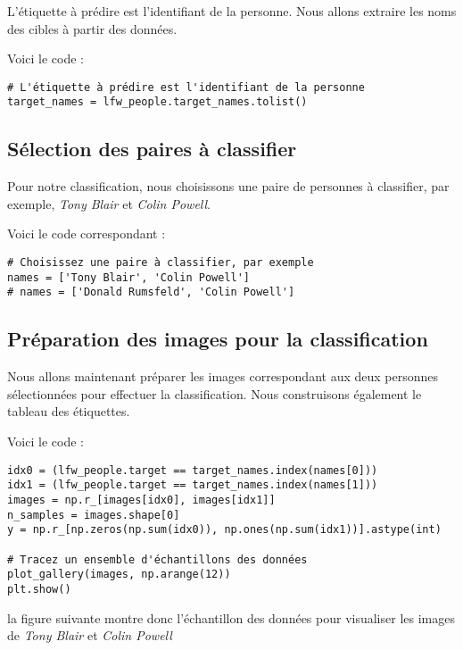 \documentclass{article}
\begin{document}
\begin{itemize}
L'étiquette à prédire est l'identifiant de la personne. Nous allons 
extraire les noms des cibles à partir des données.

Voici le code :

\begin{verbatim}
# L'étiquette à prédire est l'identifiant de la personne
target_names = lfw_people.target_names.tolist()
\end{verbatim}

\subsection{Sélection des paires à classifier}

Pour notre classification, nous choisissons une paire de personnes à 
classifier, par exemple, \textit{Tony Blair} et \textit{Colin Powell}. 

Voici le code correspondant :

\begin{verbatim}
# Choisissez une paire à classifier, par exemple
names = ['Tony Blair', 'Colin Powell']
# names = ['Donald Rumsfeld', 'Colin Powell']
\end{verbatim}
\subsection{Préparation des images pour la classification}

Nous allons maintenant préparer les images correspondant aux deux 
personnes sélectionnées pour effectuer la classification. Nous 
construisons également le tableau des étiquettes.

Voici le code :

\begin{verbatim}
idx0 = (lfw_people.target == target_names.index(names[0]))
idx1 = (lfw_people.target == target_names.index(names[1]))
images = np.r_[images[idx0], images[idx1]]
n_samples = images.shape[0]
y = np.r_[np.zeros(np.sum(idx0)), np.ones(np.sum(idx1))].astype(int)

# Tracez un ensemble d'échantillons des données
plot_gallery(images, np.arange(12))
plt.show()
\end{verbatim}

la figure suivante montre donc l'échantillon des données pour visualiser 
les images de \textit{Tony Blair} et \textit{Colin Powell}


\end{itemize}
\end{document}
